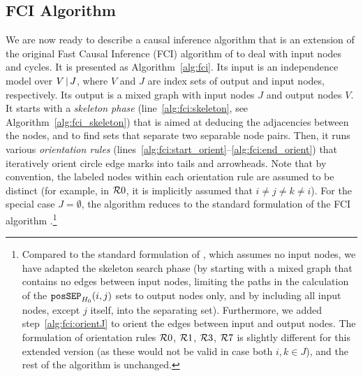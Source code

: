 \subsection{FCI Algorithm}

We are now ready to describe a causal inference algorithm that is an extension of the original
Fast Causal Inference (FCI) algorithm of \cite{SMR1995} to deal with input nodes and cycles.
It is presented as Algorithm~\ref{alg:fci}.
Its input is an independence model over $V \operatorname*{|} J$, where $V$ and $J$ are index sets of output and input nodes, respectively. 
Its output is a mixed graph with input nodes $J$ and output nodes $V$.
It starts with a \emph{skeleton phase} (line~\ref{alg:fci:skeleton}, see Algorithm~\ref{alg:fci_skeleton}) that is aimed at deducing the adjacencies between the nodes, and to find sets that separate two separable node pairs.
Then, it runs various \emph{orientation rules} (lines~\ref{alg:fci:start_orient}--\ref{alg:fci:end_orient}) that iteratively orient circle edge marks into tails and arrowheads.
Note that by convention, the labeled nodes within each orientation rule are assumed to be distinct (for example, in $\mathcal{R}0$, it is implicitly assumed that $i \ne j \ne k \ne i$).
For the special case $J = \emptyset$, the algorithm reduces to the standard formulation of the FCI algorithm \cite{Zhang2008_AI}.\footnote{Compared to the standard formulation of \cite{Zhang2008_AI}, which assumes no input nodes, we have adapted the skeleton search phase (by starting with a mixed graph that
contains no edges between input nodes, limiting the paths in the calculation of the
$\mathtt{posSEP}_{H_0}(i,j)$ sets to output nodes only, and by including all input nodes, 
except $j$ itself, into the separating set). Furthermore, we added 
step~\ref{alg:fci:orientJ} to orient the edges between input and output nodes. 
The formulation of orientation rules $\mathcal{R}0$, $\mathcal{R}1$, $\mathcal{R}3$, $\mathcal{R}7$ is slightly different for this extended version
(as these would not be valid in case both $i, k \in J$), and the rest of the algorithm is unchanged.}



